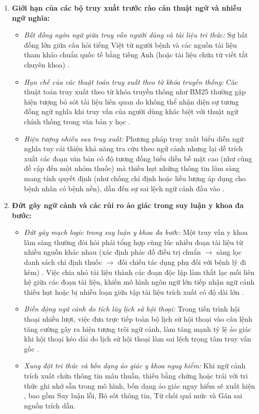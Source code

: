 \begin{enumerate}[label=(\arabic*)]
    \item \textbf{Giới hạn của các bộ truy xuất trước rào cản thuật ngữ và nhiễu ngữ nghĩa:}
    \begin{itemize}
        \item \textit{Bất đồng ngôn ngữ giữa truy vấn người dùng và tài liệu tri thức:} Sự bất đồng lớn giữa câu hỏi tiếng Việt từ người bệnh và các nguồn tài liệu tham khảo chuẩn quốc tế bằng tiếng Anh (hoặc tài liệu chứa từ viết tắt chuyên khoa) \cite{medrag2024}.
        \item \textit{Hạn chế của các thuật toán truy xuất theo từ khóa truyền thống:} Các thuật toán truy xuất theo từ khóa truyền thống như BM25 thường gặp hiện tượng bỏ sót tài liệu liên quan do không thể nhận diện sự tương đồng ngữ nghĩa khi truy vấn của người dùng khác biệt với thuật ngữ chính thống trong văn bản y học \cite{medrag2024}.
        \item \textit{Hiện tượng nhiễu sau truy xuất:} Phương pháp truy xuất biểu diễn ngữ nghĩa tuy cải thiện khả năng tra cứu theo ngữ cảnh nhưng lại dễ trích xuất các đoạn văn bản có độ tương đồng biểu diễn bề mặt cao (như cùng đề cập đến một nhóm thuốc) mà thiếu hụt những thông tin lâm sàng mang tính quyết định (như chống chỉ định hoặc liều lượng áp dụng cho bệnh nhân có bệnh nền), dẫn đến sự sai lệch ngữ cảnh đầu vào \cite{xiong2024mirage, medtrustrag}.
    \end{itemize}

    \item \textbf{Đứt gãy ngữ cảnh và các rủi ro ảo giác trong suy luận y khoa đa bước:}
    \begin{itemize}
        \item \textit{Đứt gãy mạch logic trong suy luận y khoa đa bước:} Một truy vấn y khoa lâm sàng thường đòi hỏi phải tổng hợp cùng lúc nhiều đoạn tài liệu từ nhiều nguồn khác nhau (xác định phác đồ điều trị chuẩn $\to$ sàng lọc danh sách chỉ định thuốc $\to$ đối chiếu tác dụng phụ đối với bệnh lý đi kèm) \cite{imedrag}. Việc chia nhỏ tài liệu thành các đoạn độc lập làm thất lạc mối liên hệ giữa các đoạn tài liệu, khiến mô hình ngôn ngữ lớn tiếp nhận ngữ cảnh thiếu hụt hoặc bị nhiễu loạn giữa tập tài liệu trích xuất có độ dài lớn \cite{xiong2024mirage, medtrustrag}.
        \item \textit{Biến động ngữ cảnh do tích lũy lịch sử hội thoại:} Trong tiến trình hội thoại nhiều lượt, việc đưa trực tiếp toàn bộ lịch sử hội thoại vào câu lệnh tăng cường gây ra hiện tượng trôi ngữ cảnh, làm tăng mạnh tỷ lệ ảo giác khi hội thoại kéo dài do lịch sử hội thoại làm sai lệch trọng tâm truy vấn gốc \cite{imedrag}.
        \item \textit{Xung đột tri thức và bốn dạng ảo giác y khoa nguy hiểm:} Khi ngữ cảnh trích xuất chứa thông tin mâu thuẫn, thiếu bằng chứng hoặc trái với tri thức ghi nhớ sẵn trong mô hình, bốn dạng ảo giác nguy hiểm sẽ xuất hiện \cite{medtrustrag, xiong2024mirage}, bao gồm Suy luận lỗi, Bỏ sót thông tin, Từ chối quá mức và Gán sai nguồn trích dẫn.
    \end{itemize}


\end{enumerate}
